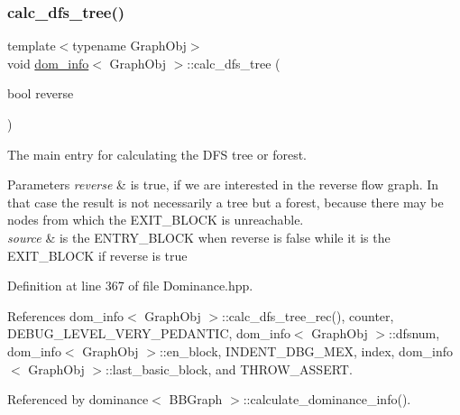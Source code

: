 \subsubsection{\texorpdfstring{calc\+\_\+dfs\+\_\+tree()}{calc\_dfs\_tree()}}
{\footnotesize\ttfamily template$<$typename Graph\+Obj$>$ \\
void \hyperlink{classdom__info}{dom\+\_\+info}$<$ Graph\+Obj $>$\+::calc\+\_\+dfs\+\_\+tree (\begin{DoxyParamCaption}\item[{bool}]{reverse }\end{DoxyParamCaption})\hspace{0.3cm}{\ttfamily [inline]}}



The main entry for calculating the D\+FS tree or forest. 


\begin{DoxyParams}{Parameters}
{\em reverse} & is true, if we are interested in the reverse flow graph. In that case the result is not necessarily a tree but a forest, because there may be nodes from which the E\+X\+I\+T\+\_\+\+B\+L\+O\+CK is unreachable. \\
\hline
{\em source} & is the E\+N\+T\+R\+Y\+\_\+\+B\+L\+O\+CK when reverse is false while it is the E\+X\+I\+T\+\_\+\+B\+L\+O\+CK if reverse is true \\
\hline
\end{DoxyParams}


Definition at line 367 of file Dominance.\+hpp.



References dom\+\_\+info$<$ Graph\+Obj $>$\+::calc\+\_\+dfs\+\_\+tree\+\_\+rec(), counter, D\+E\+B\+U\+G\+\_\+\+L\+E\+V\+E\+L\+\_\+\+V\+E\+R\+Y\+\_\+\+P\+E\+D\+A\+N\+T\+IC, dom\+\_\+info$<$ Graph\+Obj $>$\+::dfsnum, dom\+\_\+info$<$ Graph\+Obj $>$\+::en\+\_\+block, I\+N\+D\+E\+N\+T\+\_\+\+D\+B\+G\+\_\+\+M\+EX, index, dom\+\_\+info$<$ Graph\+Obj $>$\+::last\+\_\+basic\+\_\+block, and T\+H\+R\+O\+W\+\_\+\+A\+S\+S\+E\+RT.



Referenced by dominance$<$ B\+B\+Graph $>$\+::calculate\+\_\+dominance\+\_\+info().

